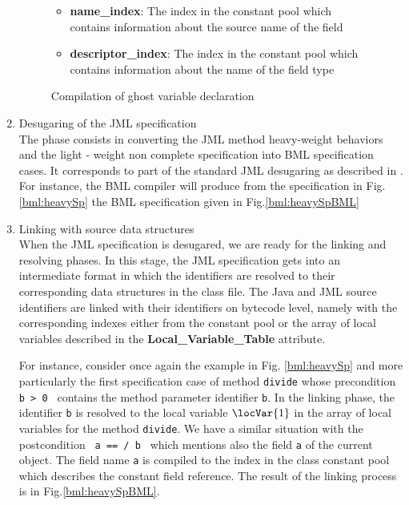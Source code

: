 \begin{enumerate}
\begin{figure}[ht!]
\begin{frameit}
\begin{itemize}
\item \textbf{name\_index}:  The index in the constant pool which contains information about the source name of the field

\item \textbf{descriptor\_index}: The index in the constant pool which contains information about the name of the field type  
\end{itemize}


\caption{\sc Compilation of ghost variable declaration}
\label{bml:compiler:ghost}
\end{frameit}
\end{figure}

\item Desugaring of the JML specification \\
      The phase consists in converting the JML method heavy-weight behaviors and the light - weight non complete
      specification into BML specification cases.
      It corresponds to part of the standard JML desugaring as described  in \cite{RT03djml}.
      For instance, the BML compiler will produce from the specification in Fig.\ref{bml:heavySp} the BML specification 
      given in Fig.\ref{bml:heavySpBML} 
      



\item Linking with source data structures \\
      When the JML specification is desugared, we are ready for the linking and resolving phases.
      In this stage, the JML specification gets into an intermediate format in which 
      the identifiers are resolved to their corresponding data structures in the class file.
      The Java and JML source identifiers are linked with their identifiers on bytecode level, 
      namely with the corresponding indexes either from the constant pool or the array of 
      local variables described in the \textbf{Local\_Variable\_Table} attribute. 

      For instance, consider once again the example in Fig. \ref{bml:heavySp} and more particularly  the first specification
      case of method \texttt{divide}  whose precondition \texttt{ b > 0 }  contains the method parameter identifier \texttt{b}.
      In the linking phase, the identifier \texttt{b} is resolved to the local variable $\locVar{1}$  in the array of
      local variables for the method \texttt{divide}.
      We have a similar situation with the postcondition \texttt{ a ==  / b }  which mentions also the field \texttt{a} of the current object.
      The field name \texttt{a} is compiled to the index in the class constant pool  which describes the constant field reference.
      The result of the linking process is in Fig.\ref{bml:heavySpBML}.


\end{enumerate}

